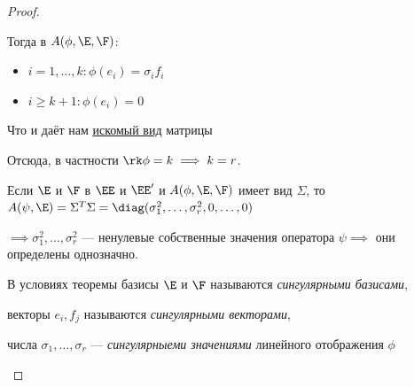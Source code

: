 \documentclass[a4paper]{article}
\begin{document}
\begin{colloq}
\begin{proof}
\begin{description}
                    Тогда в $A(\phi, \E, \F)$:
                    \begin{itemize}
                        \item $i = 1, \dots, k \colon \phi(e_i) = \sigma_i f_i$
                        \item $i \geq k + 1 \colon \phi(e_i) = 0$
                    \end{itemize}

                    Что и даёт нам \hyperref[lec31:SVD_matrix]{искомый вид} матрицы

                    \bigskip
                    Отсюда, в частности $\rk \phi = k \implies k = r$.

                    \item[Единственность:] \mbox{}
                    \item[] 
                        Если $\E$ и $\F$ в $\EE$ и $\EE'$ и $A(\phi, \E, \F)$ имеет вид \hyperref[lec31:SVD_matrix]{$\Sigma$}, то $A(\psi, \E) = \Sigma^{T} \Sigma = \diag(\sigma_1^2, \dots, \sigma_r^2, 0, \dots, 0) $
                        
                        $\implies \sigma_1^2, \dots, \sigma_r^2$ --- ненулевые собственные значения оператора $\psi \implies$ они определены однозначно.
            
                \end{description}

                \bigskip    
                \begin{definition}
                    В условиях теоремы базисы $\E$ и $\F$ называются \textit{сингулярными базисами}, 
                    
                    векторы $e_i, f_j$ называются \textit{сингулярными векторами}, 
                    
                    числа $\sigma_1, \dots, \sigma_r$ --- \textit{сингулярныеми значениями} линейного отображения $\phi$
                \end{definition}

            \end{proof}

    \end{colloq}
\end{document}
